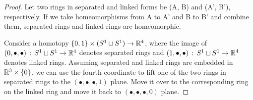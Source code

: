 \documentclass[a4paper, 10pt]{article}
\begin{document}
\begin{proof}
    Let two rings in separated and linked forms be (A, B) and (A', B'), respectively. If we take homeomorphisms from A to A' and B to B' and combine them, separated rings and linked rings are homeomorphic.

     Consider a homotopy $\{0, 1\} \times (S^{1} \sqcup S^{1}) \rightarrow \mathbb{R}^{4}$, where the image of $(0,\bullet,\bullet)\,:\, S^{1}\sqcup S^{1} \rightarrow \mathbb{R}^{4}$ denotes separated rings and $(1,\bullet,\bullet) \,:\, S^{1} \sqcup S^{1} \rightarrow \mathbb{R}^{4}$ denotes linked rings. Assuming separated and linked rings are embedded in $\mathbb{R}^{3} \times \{0\}$, we can use the fourth coordinate to lift one of the two rings in separated rings to the $(\bullet, \bullet, \bullet, 1)$ plane. Move it over to the corresponding ring on the linked ring and move it back to $(\bullet, \bullet, \bullet, 0)$ plane.
\end{proof}
\end{document}

